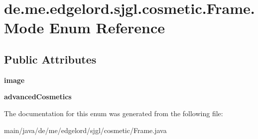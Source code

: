 \hypertarget{enumde_1_1me_1_1edgelord_1_1sjgl_1_1cosmetic_1_1_frame_1_1_mode}{}\section{de.\+me.\+edgelord.\+sjgl.\+cosmetic.\+Frame.\+Mode Enum Reference}
\label{enumde_1_1me_1_1edgelord_1_1sjgl_1_1cosmetic_1_1_frame_1_1_mode}
\subsection*{Public Attributes}
\begin{DoxyCompactItemize}
\item 
\mbox{\label{enumde_1_1me_1_1edgelord_1_1sjgl_1_1cosmetic_1_1_frame_1_1_mode_ac5014236f1cda41a3066cc99972cba55}} 
{\bfseries image}
\item 
\mbox{\label{enumde_1_1me_1_1edgelord_1_1sjgl_1_1cosmetic_1_1_frame_1_1_mode_a8a42c00bf29e3c82b7557681c6824c32}} 
{\bfseries advanced\+Cosmetics}
\end{DoxyCompactItemize}


The documentation for this enum was generated from the following file\+:\begin{DoxyCompactItemize}
\item 
main/java/de/me/edgelord/sjgl/cosmetic/Frame.\+java\end{DoxyCompactItemize}
